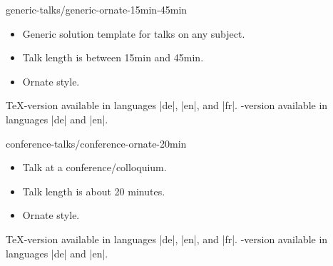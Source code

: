 \begin{solution}{generic-talks/generic-ornate-15min-45min}
  \begin{itemize}
  \item
    Generic solution template for talks on any subject.
  \item
    Talk length is between 15min and 45min.
  \item
    Ornate style.
  \end{itemize}
  \beamernote \TeX-version available in languages |de|, |en|, and |fr|.
  \lyxnote    \LyX-version available in languages |de| and |en|.
\end{solution}

\begin{solution}{conference-talks/conference-ornate-20min}
  \begin{itemize}
  \item
    Talk at a conference/colloquium.
  \item
    Talk length is about 20 minutes.
  \item
    Ornate style.
  \end{itemize}
  \beamernote \TeX-version available in languages |de|, |en|, and |fr|.
  \lyxnote    \LyX-version available in languages |de| and |en|.
\end{solution}


